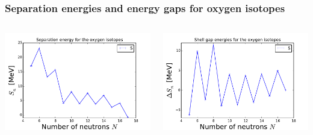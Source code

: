 \documentclass[compress]{beamer}
\begin{document}
\frame
    {
      \frametitle{Separation energies and energy gaps for oxygen isotopes}
      \begin{footnotesize}
     \begin{columns}
      \column{5.0cm}
      \begin{center}
	\includegraphics[width=1.2\textwidth]{snoxygen.pdf}
      \end{center}
\column{5cm}
      \begin{center}
	\includegraphics[width=1.2\textwidth]{gapoxygen.pdf}
      \end{center}
\end{columns}
      \end{footnotesize}
    }
\end{document}
